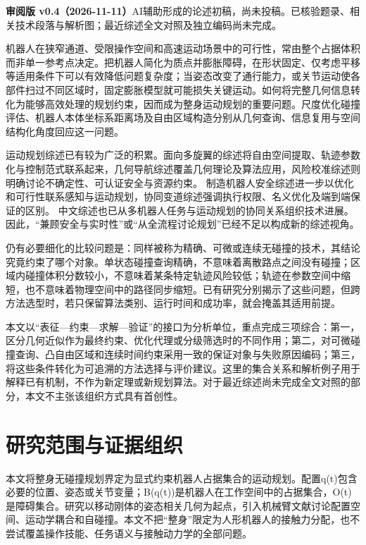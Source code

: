 \documentclass{aas}
\begin{document}
\cnaddress{}
\enaddress{}
\doi{}
\cstr{}
\makeatletter
\let\caddress\@empty
\let\aas@enaddress\@empty
\let\aas@doi\@empty
\let\aas@cstr\@empty
\makeatother
\maketitle
\pagestyle{plain}\thispagestyle{plain}
\noindent\textbf{审阅版 v0.4（2026-11-11）}\quad AI辅助形成的论述初稿，尚未投稿。已核验题录、相关技术段落与解析图；最近综述全文对照及独立编码尚未完成。\par\medskip
机器人在狭窄通道、受限操作空间和高速运动场景中的可行性，常由整个占据体积而非单一参考点决定。把机器人简化为质点并膨胀障碍，在形状固定、仅考虑平移等适用条件下可以有效降低问题复杂度；当姿态改变了通行能力，或关节运动使各部件扫过不同区域时，固定膨胀模型就可能损失关键运动。如何将完整几何信息转化为能够高效处理的规划约束，因而成为整身运动规划的重要问题。尺度优化碰撞评估、机器人本体坐标系距离场及自由区域构造分别从几何查询、信息复用与空间结构化角度回应这一问题。\cite{R01}\cite{R07}\cite{R02}

运动规划综述已有较为广泛的积累。面向多旋翼的综述将自由空间提取、轨迹参数化与控制范式联系起来，几何导航综述覆盖几何理论及算法应用，风险校准综述则明确讨论不确定性、可认证安全与资源约束。\cite{S02}\cite{S06}\cite{S07} 制造机器人安全综述进一步以优化和可行性联系感知与运动规划，协同变道综述强调执行权限、名义优化及端到端保证的区别。\cite{S09}\cite{S10} 中文综述也已从多机器人任务与运动规划的协同关系组织技术进展。\cite{J01} 因此，“兼顾安全与实时性”或“从全流程讨论规划”已经不足以构成新的综述视角。

仍有必要细化的比较问题是：同样被称为精确、可微或连续无碰撞的技术，其结论究竟约束了哪个对象。单状态碰撞查询精确，不意味着离散路点之间没有碰撞；区域内碰撞体积分数较小，不意味着某条特定轨迹风险较低；轨迹在参数空间中缩短，也不意味着物理空间中的路径同步缩短。已有研究分别揭示了这些问题，但跨方法选型时，若只保留算法类别、运行时间和成功率，就会掩盖其适用前提。\cite{R15}\cite{R21}\cite{R30}

本文以“表征---约束---求解---验证”的接口为分析单位，重点完成三项综合：第一，区分几何近似作为最终约束、优化代理或分级筛选时的不同作用；第二，对可微碰撞查询、凸自由区域和连续时间约束采用一致的保证对象与失败原因编码；第三，将这些条件转化为可追溯的方法选择与评价建议。这里的集合关系和解析例子用于解释已有机制，不作为新定理或新规划算法。对于最近综述尚未完成全文对照的部分，本文不主张该组织方式具有首创性。

\section{研究范围与证据组织}
本文将整身无碰撞规划界定为显式约束机器人占据集合的运动规划。配置q(t)包含必要的位置、姿态或关节变量；B(q(t))是机器人在工作空间中的占据集合，O(t)是障碍集合。研究以移动刚体的姿态相关几何为起点，引入机械臂文献讨论配置空间、运动学耦合和自碰撞。本文不把“整身”限定为人形机器人的接触力分配，也不尝试覆盖操作技能、任务语义与接触动力学的全部问题。
\end{document}
